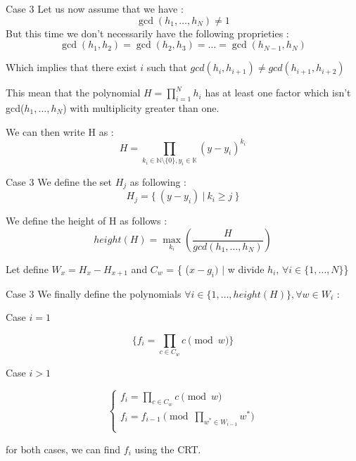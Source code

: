 \documentclass{beamer}
\begin{document}
\begin{frame}{Case 3}
Let us now assume that we have :
\[\gcd(h_{1},\dots,h_{N}) \neq 1\]
But this time we don't necessarily have the following proprieties :
\[\gcd(h_{1},h_{2}) = \gcd(h_{2},h_{3}) = \dots = \gcd(h_{N-1},h_{N}) \]

Which implies that there exist $i$ such that $gcd(h_{i},h_{i+1}) \neq gcd(h_{i+1},h_{i+2})$

This mean that the polynomial $H = \prod_{i=1}^{N} h_{i}$ has at least one factor which isn't gcd($h_{1},\dots,h_{N}$) with multiplicity greater than one.

We can then write H as :
\[H=\prod_{k_{i} \in \mathbb{N}
 \setminus \{0\}, y_{i}\in \mathbb{K}} (y-y_{i})^{k_{i}}\]

\end{frame}

\begin{frame}{Case 3}
    We define the set $H_{j}$ as following :
\[H_{j} = \{\ (y-y_{i}) \ |\  k_{i} \geq j\ \}\]

We define the height of H as follows : \[height(H) = \max_{k_{i}}(\frac{H}{gcd(h_{1},\dots,h_{N})})\]

Let define $W_{x} = H_{x}-H_{x+1}$ and $C_{w}$ = \{ ($x-g_{i})$ $|$ w divide $h_{i}$, $\forall i \in \{1,\dots,N\}$\}\newline
\end{frame}

\begin{frame}{Case 3}
    We finally define the polynomials $\forall i \in \{1,\dots,height(H)\}, \forall w \in W_{i}$ :

Case $i = 1$

\[\{ f_{i} = \prod_{c \in C_{w} } c \pmod w \}\]

Case $i > 1$

\begin{displaymath}
    \left\{
    \begin{array}{ll}
    f_{i} = \prod_{c \in C_{w} } c \pmod w \\
    f_{i} = f_{i-1} \pmod{\prod_{w^{*} \in W_{i-1}} w^{*}}\\
    \end{array}
    \right.
\end{displaymath}

for both cases, we can find $f_{i}$ using the CRT\@.
\end{frame}
\end{document}
